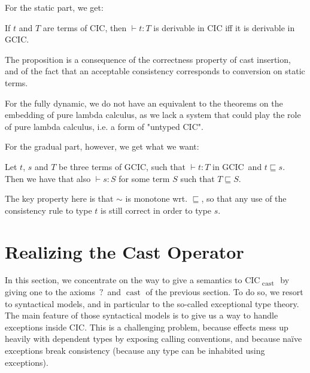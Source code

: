 \documentclass{kaobook}
\renewcommand{\mathtt}{\mathrm}
\newcommand{\cons}{\sim}
\newcommand{\pre}{\sqsubseteq}
\DeclareMathOperator{\?}{?}
\newcommand{\cas}{\operatorname{\mathtt{cast}}}
\newcommand{\gcic}{GCIC}
\newcommand{\cacic}{CIC\textsubscript{$\cas$}}
\begin{document}
{For the static part, we get:
\begin{prop}[Embedding of CIC in \cacic]
	If $t$ and $T$ are terms of CIC, then $\vdash t : T$ is derivable in CIC iff it is derivable in \gcic.
\end{prop}
\begin{dem}[Sketch]
	The proposition is a consequence of the correctness property of cast insertion, and of the fact that an acceptable consistency corresponds to conversion on static terms.
\end{dem}

For the fully dynamic, we do not have an equivalent to the theorems on the embedding of pure lambda calculus, as we lack a system that could play the role of pure lambda calculus, i.e. a form of "untyped CIC".


For the gradual part, however, we get what we want:
\begin{prop}
	Let $t$, $s$ and $T$ be three terms of \gcic, such that $\vdash t : T$ in \gcic\ and $t \pre s$. Then we have that also $\vdash s : S$ for some term $S$ such that $T \pre S$.
\end{prop}
\begin{dem}[Sketch]
	The key property here is that $\cons$ is monotone wrt. $\pre$, so that any use of the consistency rule to type $t$ is still correct in order to type $s$.
\end{dem}


\section{Realizing the Cast Operator}
\label{cast}

In this section, we concentrate on the way to give a semantics to \cacic\ by giving one to the axioms $\?$ and $\cas$ of the previous section. To do so, we resort to syntactical models, and in particular to the so-called exceptional type theory. The main feature of those syntactical models is to give us a way to handle exceptions inside CIC. This is a challenging problem, because effects mess up heavily with dependent types by exposing calling conventions, and because naïve exceptions break consistency (because any type can be inhabited using exceptions).

}
\end{document}

